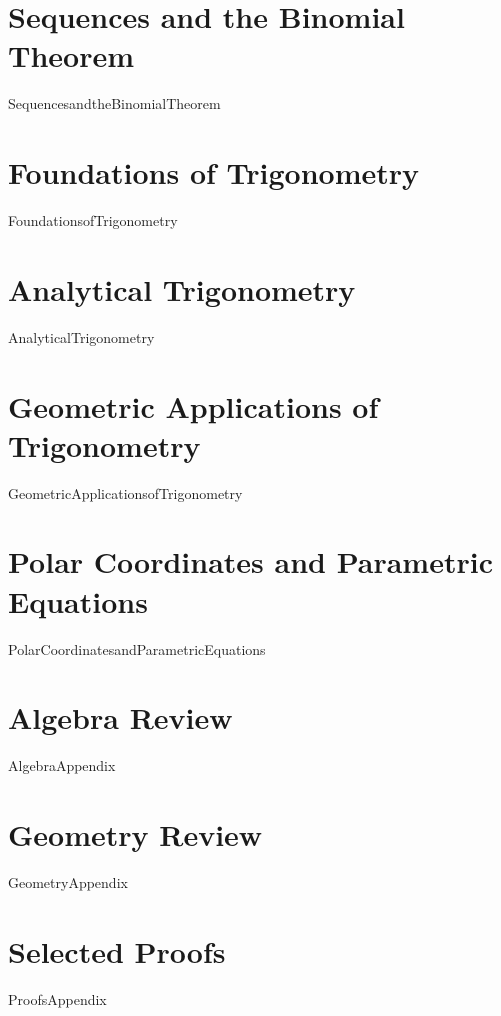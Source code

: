 \documentclass[11pt]{book}
\theoremstyle{definition}  %
\begin{document}
\chapter{Sequences and the Binomial Theorem}
\label{SequencesandtheBinomialTheorem}
\thispagestyle{empty}
{SequencesandtheBinomialTheorem}

\chapter{Foundations of Trigonometry}
\label{FoundationsofTrigonometry}
\thispagestyle{empty}
{FoundationsofTrigonometry}

\chapter{Analytical Trigonometry}
\label{AnalyticalTrigonometry}
\thispagestyle{empty}
{AnalyticalTrigonometry}

\chapter{Geometric Applications of Trigonometry}
\label{GeometricApplicationsofTrigonometry}
\thispagestyle{empty}
{GeometricApplicationsofTrigonometry}

\chapter{Polar Coordinates and Parametric Equations}
\label{PolarCoordinatesandParametricEquations}
\thispagestyle{empty}
{PolarCoordinatesandParametricEquations}

\appendix

\chapter{Algebra Review}
\label{AlgebraAppendix}
\thispagestyle{empty}
{AlgebraAppendix}

\chapter{Geometry Review}
\label{GeometryAppendix}
\thispagestyle{empty}
{GeometryAppendix}

\chapter{Selected Proofs}
\label{ProofsAppendix}
\thispagestyle{empty}
{ProofsAppendix}
\end{document}
